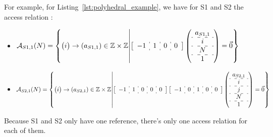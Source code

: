 \documentclass[paper=a4, fontsize=11pt]{scrartcl}
\numberwithin{equation}{section}        %
\numberwithin{figure}{section}          %
\numberwithin{table}{section}               %
\begin{document}
        For example, for Listing~\ref{lst:polyhedral_example}, we have for S1 and S2 the
        access relation :
        \begin{itemize}
            \item[]
                $
                \mathcal{A}_{S1,1}(N) = 
                \left\{
                \begin{pmatrix}i\end{pmatrix} \to \left(a_{S1,1}\right) \in \mathbb{Z}\times\mathbb{Z}
                    \middle|
                    \left[\begin{array}{c:c:c:c}-1 & 1 & 0 & 0 \end{array}\right]
                    \left(\begin{array}{c}a_{S1,1}\\\hdashline i\\\hdashline N\\\hdashline 1\end{array}\right)
                    = \vec{0}
                \right\}
                $
            
            \item[]
                $
                \mathcal{A}_{S2,1}(N) = 
                \left\{
                \begin{pmatrix}i\end{pmatrix} \to \left(a_{S2,1}\right) \in \mathbb{Z}\times\mathbb{Z}
                    \middle|
                    \left[\begin{array}{c:c:c:c:c}-1 & 1 & 0 & 0 & 0 \end{array}\right]
                    \left[\begin{array}{c:c:c:c:c}-1 & 0 & 1 & 0 & 0 \end{array}\right]
                    \left(\begin{array}{c}a_{S2,1}\\\hdashline i\\\hdashline j\\\hdashline N\\\hdashline 1\end{array}\right)
                    = \vec{0}
                \right\}
                $
        \end{itemize}

        Because S1 and S2 only have one reference, there's only one access relation for
        each of them.

\end{document}

